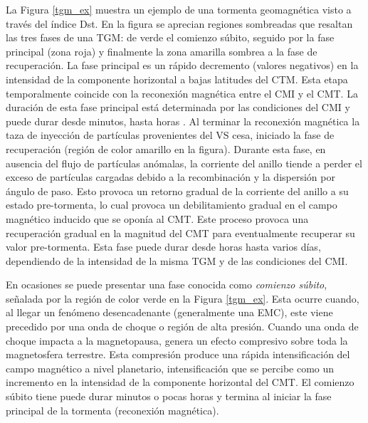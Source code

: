 La Figura \ref{tgm_ex} muestra un ejemplo de una tormenta geomagnética visto a través del índice Dst. En la figura se aprecian regiones sombreadas que resaltan las tres fases de una TGM: de verde el comienzo súbito, seguido por la fase principal (zona roja) y finalmente la zona amarilla sombrea a la fase de recuperación. La fase principal es un rápido decremento (valores negativos) en la intensidad de la componente horizontal a bajas latitudes del CTM. Esta etapa temporalmente coincide con la reconexión magnética entre el CMI y el CMT. La duración de esta fase principal está determinada por las condiciones del CMI y puede durar desde minutos, hasta horas \parencite{l_handbook_geof_sw_Geom_field}. Al terminar la reconexión magnética la taza de inyección de partículas provenientes del VS cesa, iniciado la fase de recuperación (región de color amarillo en la figura). Durante esta fase, en ausencia del flujo de partículas anómalas, la corriente del anillo tiende a perder el exceso de partículas cargadas debido a la recombinación y la dispersión por ángulo de paso. Esto provoca un retorno gradual de la corriente del anillo a su estado pre-tormenta, lo cual provoca un debilitamiento gradual en el campo magnético inducido que se oponía al CMT. Este proceso provoca una recuperación gradual en la magnitud del CMT para eventualmente recuperar su valor pre-tormenta. Esta fase puede durar desde horas hasta varios días, dependiendo de la intensidad de la misma TGM y de las condiciones del CMI.
\vspace{ 1 em}

En ocasiones se puede presentar una fase conocida como \emph{comienzo súbito}, señalada por la región de color verde en la Figura \ref{tgm_ex}. Esta ocurre cuando, al llegar un fenómeno desencadenante (generalmente una EMC), este viene precedido por una onda de choque o región de alta presión. Cuando una onda de choque impacta a la magnetopausa, genera un efecto compresivo sobre toda la magnetosfera terrestre. Esta compresión produce una rápida intensificación del campo magnético a nivel planetario, intensificación que se percibe como un incremento en la intensidad de la componente horizontal del CMT. El comienzo súbito tiene puede durar minutos o pocas horas \parencite{l_handbook_geof_sw_Geom_field} y termina al iniciar la fase principal de la tormenta (reconexión magnética).
\vspace{1 em}

